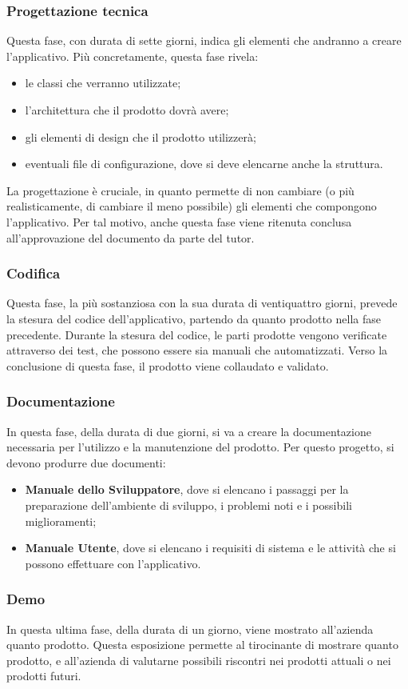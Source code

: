\subsubsection{Progettazione tecnica}
Questa fase, con durata di sette giorni, indica gli elementi che andranno a creare l'applicativo.
Più concretamente, questa fase rivela:
\begin{itemize}
    \item le classi che verranno utilizzate;
    \item l'architettura che il prodotto dovrà avere;
    \item gli elementi di design che il prodotto utilizzerà;
    \item eventuali file di configurazione, dove si deve elencarne anche la struttura.
\end{itemize}
La progettazione è cruciale, in quanto permette di non cambiare (o più realisticamente, di cambiare il meno possibile) gli elementi che compongono l'applicativo.
Per tal motivo, anche questa fase viene ritenuta conclusa all'approvazione del documento da parte del tutor.
\subsubsection{Codifica}
Questa fase, la più sostanziosa con la sua durata di ventiquattro giorni, prevede la stesura del codice dell'applicativo, partendo da quanto prodotto nella fase precedente.
Durante la stesura del codice, le parti prodotte vengono verificate attraverso dei test, che possono essere sia manuali che automatizzati.
Verso la conclusione di questa fase, il prodotto viene collaudato e validato.
\subsubsection{Documentazione}
In questa fase, della durata di due giorni, si va a creare la documentazione necessaria per l'utilizzo e la manutenzione del prodotto.
Per questo progetto, si devono produrre due documenti:
\begin{itemize}
    \item \textbf{Manuale dello Sviluppatore}, dove si elencano i passaggi per la preparazione dell'ambiente di sviluppo, i problemi noti e i possibili miglioramenti;
    \item \textbf{Manuale Utente}, dove si elencano i requisiti di sistema e le attività che si possono effettuare con l'applicativo.
\end{itemize}
\subsubsection{Demo}
In questa ultima fase, della durata di un giorno, viene mostrato all'azienda quanto prodotto.
Questa esposizione permette al tirocinante di mostrare quanto prodotto, e all'azienda di valutarne possibili riscontri nei prodotti attuali o nei prodotti futuri.

